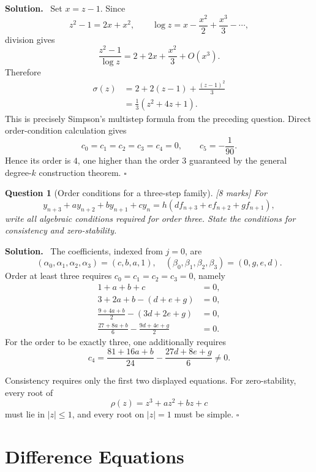 \documentclass[11pt,a4paper]{article}
\theoremstyle{questionstyle}
\newtheorem{question}{Question}
\newenvironment{solution}
  {\par\noindent\textbf{\color{solutiongreen}Solution.}\ }
  {\hfill$\square$\par}
\newcommand{\pointmark}[1]{\hfill\textnormal{\textit{[#1 marks]}}}
\newcommand{\abs}[1]{\left|#1\right|}
\begin{document}
\begin{solution}
Set \(x=z-1\).  Since
\[
  z^2-1=2x+x^2,\qquad
  \log z=x-\frac{x^2}{2}+\frac{x^3}{3}-\cdots,
\]
division gives
\[
  \frac{z^2-1}{\log z}
  =2+2x+\frac{x^2}{3}+O(x^3).
\]
Therefore
\[
\begin{split}
  \sigma(z)
  &=2+2(z-1)+\frac{(z-1)^2}{3}\\
  &=\frac13(z^2+4z+1).
\end{split}
\]
This is precisely Simpson's multistep formula from the preceding
question.  Direct order-condition calculation gives
\[
  c_0=c_1=c_2=c_3=c_4=0,\qquad c_5=-\frac1{90}.
\]
Hence its order is \(4\), one higher than the order \(3\) guaranteed
by the general degree-\(k\) construction theorem.
\end{solution}

\begin{question}[Order conditions for a three-step family]\pointmark{8}
For
\[
  y_{n+3}+ay_{n+2}+by_{n+1}+cy_n
  =h(df_{n+3}+ef_{n+2}+gf_{n+1}),
\]
write all algebraic conditions required for order three.  State the
conditions for consistency and zero-stability.
\end{question}

\begin{solution}
The coefficients, indexed from \(j=0\), are
\[
  (\alpha_0,\alpha_1,\alpha_2,\alpha_3)=(c,b,a,1),
\quad
  (\beta_0,\beta_1,\beta_2,\beta_3)=(0,g,e,d).
\]
Order at least three requires \(c_0=c_1=c_2=c_3=0\), namely
\[
\begin{aligned}
  1+a+b+c&=0,\\
  3+2a+b-(d+e+g)&=0,\\
  \frac{9+4a+b}{2}-(3d+2e+g)&=0,\\
  \frac{27+8a+b}{6}-\frac{9d+4e+g}{2}&=0.
\end{aligned}
\]
For the order to be exactly three, one additionally requires
\[
  c_4=
  \frac{81+16a+b}{24}
  -\frac{27d+8e+g}{6}\neq0.
\]

Consistency requires only the first two displayed equations.  For
zero-stability, every root of
\[
  \rho(z)=z^3+az^2+bz+c
\]
must lie in \(\abs z\leq1\), and every root on \(\abs z=1\) must be
simple.
\end{solution}

\section{Difference Equations}
\end{document}

